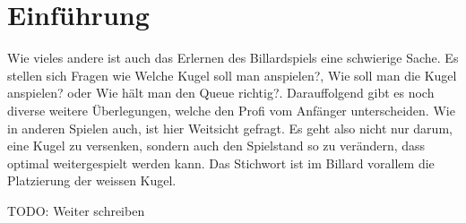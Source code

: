 \chapter{Einführung}
Wie vieles andere ist auch das Erlernen des Billardspiels eine schwierige Sache. Es stellen sich Fragen wie \glqq Welche
Kugel soll man anspielen?\grqq{}, \glqq Wie soll man die Kugel anspielen?\grqq{} oder \glqq Wie hält man den Queue richtig?\grqq{}.
Darauffolgend gibt es noch diverse weitere Überlegungen, welche den Profi vom Anfänger unterscheiden. Wie in anderen Spielen
auch, ist hier Weitsicht gefragt. Es geht also nicht nur darum, eine Kugel zu versenken, sondern auch den Spielstand so zu
verändern, dass optimal weitergespielt werden kann. Das Stichwort ist im Billard vorallem die Platzierung der weissen Kugel.

TODO: Weiter schreiben